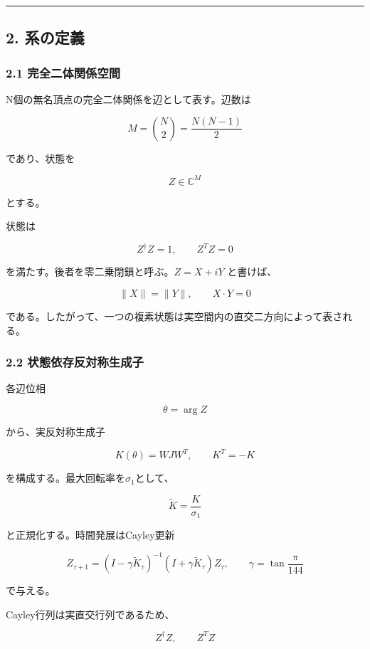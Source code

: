 \documentclass[
  a4paper,
]{ltjsarticle}
\begin{document}
\begin{center}\rule{0.5\linewidth}{0.5pt}\end{center}

\subsection{2. 系の定義}\label{ux7cfbux306eux5b9aux7fa9}

\subsubsection{2.1
完全二体関係空間}\label{ux5b8cux5168ux4e8cux4f53ux95a2ux4fc2ux7a7aux9593}

N個の無名頂点の完全二体関係を辺として表す。辺数は

\[
M=\binom{N}{2}=\frac{N(N-1)}{2}
\]

であり、状態を

\[
Z\in\mathbb C^M
\]

とする。

状態は

\[
Z^\dagger Z=1,
\qquad
Z^T Z=0
\]

を満たす。後者を零二乗閉鎖と呼ぶ。\(Z=X+iY\) と書けば、

\[
\|X\|=\|Y\|,
\qquad
X\cdot Y=0
\]

である。したがって、一つの複素状態は実空間内の直交二方向によって表される。

\subsubsection{2.2
状態依存反対称生成子}\label{ux72b6ux614bux4f9dux5b58ux53cdux5bfeux79f0ux751fux6210ux5b50}

各辺位相

\[
\theta=\arg Z
\]

から、実反対称生成子

\[
K(\theta)=WJW^T,
\qquad
K^T=-K
\]

を構成する。最大回転率を\(\sigma_1\)として、

\[
\widetilde K=\frac{K}{\sigma_1}
\]

と正規化する。時間発展はCayley更新

\[
Z_{\tau+1}
=
\left(I-\gamma\widetilde K_\tau\right)^{-1}
\left(I+\gamma\widetilde K_\tau\right)Z_\tau,
\qquad
\gamma=\tan\frac{\pi}{144}
\]

で与える。

Cayley行列は実直交行列であるため、

\[
Z^\dagger Z,
\qquad
Z^T Z
\]
\end{document}

